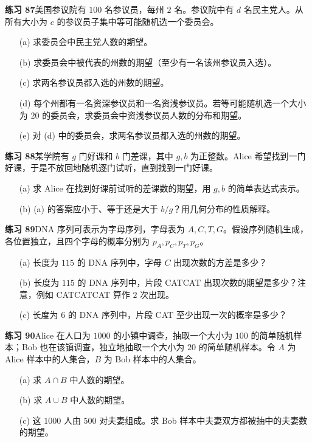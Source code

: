 \documentclass[UTF8, 12pt, fontset=fandol, oneside]{ctexart}
\begin{document}
\noindent\textbf{练习 87}\quad 美国参议院有 $100$ 名参议员，每州 $2$ 名。参议院中有 $d$ 名民主党人。从所有大小为 $c$ 的参议员子集中等可能随机选一个委员会。
\begin{enumerate}
  \item[(a)] 求委员会中民主党人数的期望。
  \item[(b)] 求委员会中被代表的州数的期望（至少有一名该州参议员入选）。
  \item[(c)] 求两名参议员都入选的州数的期望。
  \item[(d)] 每个州都有一名资深参议员和一名资浅参议员。若等可能随机选一个大小为 $20$ 的委员会，求委员会中资浅参议员人数的分布和期望。
  \item[(e)] 对 (d) 中的委员会，求两名参议员都入选的州数的期望。
\end{enumerate}

\noindent\textbf{练习 88}\quad 某学院有 $g$ 门好课和 $b$ 门差课，其中 $g,b$ 为正整数。Alice 希望找到一门好课，于是不放回地随机逐门试听，直到找到一门好课。
\begin{enumerate}
  \item[(a)] 求 Alice 在找到好课前试听的差课数的期望，用 $g,b$ 的简单表达式表示。
  \item[(b)] (a) 的答案应小于、等于还是大于 $b/g$？用几何分布的性质解释。
\end{enumerate}

\noindent\textbf{练习 89}\quad DNA 序列可表示为字母序列，字母表为 $A,C,T,G$。假设序列随机生成，各位置独立，且四个字母的概率分别为 $p_A,p_C,p_T,p_G$。
\begin{enumerate}
  \item[(a)] 长度为 $115$ 的 DNA 序列中，字母 $C$ 出现次数的方差是多少？
  \item[(b)] 长度为 $115$ 的 DNA 序列中，片段 CATCAT 出现次数的期望是多少？注意，例如 CATCATCAT 算作 $2$ 次出现。
  \item[(c)] 长度为 $6$ 的 DNA 序列中，片段 CAT 至少出现一次的概率是多少？
\end{enumerate}

\noindent\textbf{练习 90}\quad Alice 在人口为 $1000$ 的小镇中调查，抽取一个大小为 $100$ 的简单随机样本；Bob 也在该镇调查，独立地抽取一个大小为 $20$ 的简单随机样本。令 $A$ 为 Alice 样本中的人集合，$B$ 为 Bob 样本中的人集合。
\begin{enumerate}
  \item[(a)] 求 $A\cap B$ 中人数的期望。
  \item[(b)] 求 $A\cup B$ 中人数的期望。
  \item[(c)] 这 $1000$ 人由 $500$ 对夫妻组成。求 Bob 样本中夫妻双方都被抽中的夫妻数的期望。
\end{enumerate}
\end{document}

